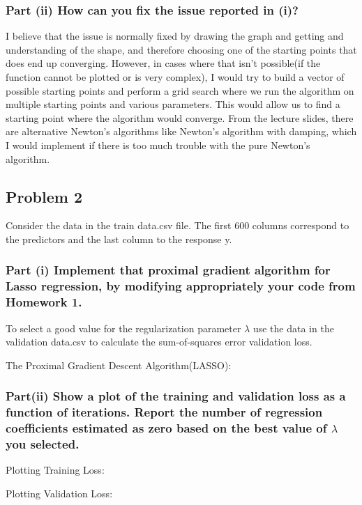\documentclass[
  letterpaper,
  DIV=11,
  numbers=noendperiod]{scrartcl}
\begin{document}
\subsubsection{Part (ii) How can you fix the issue reported in
(i)?}\label{part-ii-how-can-you-fix-the-issue-reported-in-i}

I believe that the issue is normally fixed by drawing the graph and
getting and understanding of the shape, and therefore choosing one of
the starting points that does end up converging. However, in cases where
that isn't possible(if the function cannot be plotted or is very
complex), I would try to build a vector of possible starting points and
perform a grid search where we run the algorithm on multiple starting
points and various parameters. This would allow us to find a starting
point where the algorithm would converge. From the lecture slides, there
are alternative Newton's algorithms like Newton's algorithm with
damping, which I would implement if there is too much trouble with the
pure Newton's algorithm.

\newpage

\subsection{Problem 2}\label{problem-2}

Consider the data in the train data.csv file. The first 600 columns
correspond to the predictors and the last column to the response y.

\subsubsection{Part (i) Implement that proximal gradient algorithm for
Lasso regression, by modifying appropriately your code from Homework
1.}\label{part-i-implement-that-proximal-gradient-algorithm-for-lasso-regression-by-modifying-appropriately-your-code-from-homework-1.}

To select a good value for the regularization parameter \(λ\) use the
data in the validation data.csv to calculate the sum-of-squares error
validation loss.

The Proximal Gradient Descent Algorithm(LASSO):

\subsubsection{\texorpdfstring{Part(ii) Show a plot of the training and
validation loss as a function of iterations. Report the number of
regression coefficients estimated as zero based on the best value of
\(λ\) you
selected.}{Part(ii) Show a plot of the training and validation loss as a function of iterations. Report the number of regression coefficients estimated as zero based on the best value of λ you selected.}}\label{partii-show-a-plot-of-the-training-and-validation-loss-as-a-function-of-iterations.-report-the-number-of-regression-coefficients-estimated-as-zero-based-on-the-best-value-of-ux3bb-you-selected.}

Plotting Training Loss:

Plotting Validation Loss:
\end{document}
